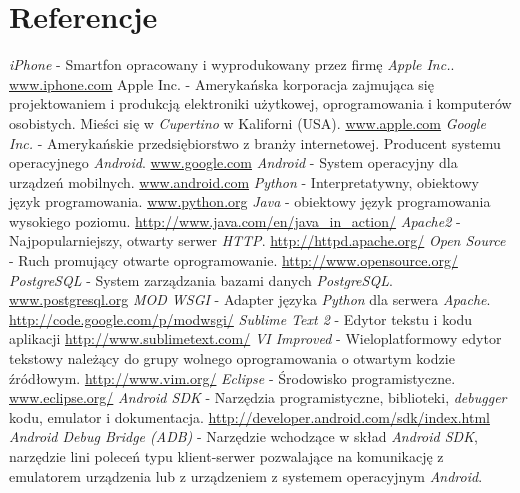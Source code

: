 %

\renewcommand*{\refname}{} %
\section*{Referencje}\label{sec:referencje}     %

\begin{thebibliography}{99}
	\emph{iPhone} - Smartfon opracowany i wyprodukowany przez firmę \emph{Apple Inc.}. 
	\url{www.iphone.com}
	Apple Inc. - Amerykańska korporacja zajmująca się projektowaniem i produkcją elektroniki użytkowej, 
	oprogramowania i komputerów osobistych. Mieści się w \emph{Cupertino} w Kaliforni (USA). 
	\url{www.apple.com}
	\emph{Google Inc.} - Amerykańskie przedsiębiorstwo z branży internetowej. Producent systemu operacyjnego \emph{Android}.
	\url{www.google.com}
	\emph{Android} - System operacyjny dla urządzeń mobilnych.	
	\url{www.android.com}
	\emph{Python} - Interpretatywny, obiektowy język programowania.
	\url{www.python.org}
	\emph{Java} - obiektowy język programowania wysokiego poziomu.
	\url{http://www.java.com/en/java_in_action/}	
	\emph{Apache2} - Najpopularniejszy, otwarty serwer \emph{HTTP}.
	\url{http://httpd.apache.org/}
	\emph{Open Source} - Ruch promujący otwarte oprogramowanie.
	\url{http://www.opensource.org/}
	\emph{PostgreSQL} - System zarządzania bazami danych \emph{PostgreSQL}.
	\url{www.postgresql.org}
	\emph{MOD WSGI} - Adapter języka \emph{Python} dla serwera \emph{Apache}.
	\url{http://code.google.com/p/modwsgi/}
        \emph{Sublime Text 2} - Edytor tekstu i kodu aplikacji
	\url{http://www.sublimetext.com/}
	\emph{VI Improved} - Wieloplatformowy edytor tekstowy należący do grupy wolnego oprogramowania o otwartym kodzie źródłowym.
	\url{http://www.vim.org/}
	\emph{Eclipse} - Środowisko programistyczne.
	\url{www.eclipse.org/}
	\emph{Android SDK} - Narzędzia programistyczne, biblioteki, \emph{debugger} kodu, emulator i dokumentacja.
	\url{http://developer.android.com/sdk/index.html}
	\emph{Android Debug Bridge (ADB)} - Narzędzie wchodzące w skład \emph{Android SDK}, narzędzie lini poleceń typu klient-serwer pozwalające na komunikację z emulatorem urządzenia lub z urządzeniem z systemem operacyjnym \emph{Android}.

\end{thebibliography}
